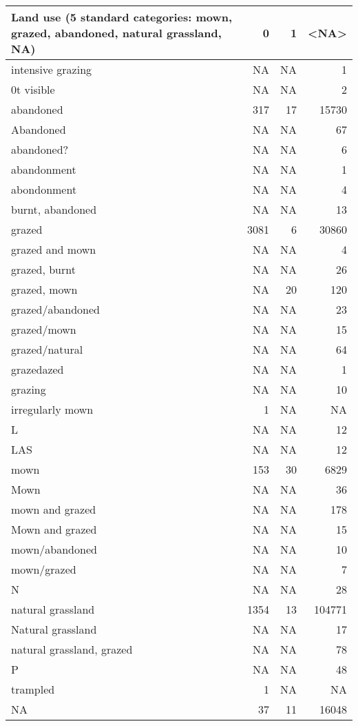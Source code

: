 \documentclass[table]{article}
\begin{document}
\begin{tabular}{>{\raggedright\arraybackslash}p{8cm}|r|r|r}
\hline
Land use (5 standard categories: mown, grazed, abandoned, natural grassland, NA) & 0 & 1 & <NA>\\
\hline
0 intensive grazing & NA & NA & 1\\
\hline
0t visible & NA & NA & 2\\
\hline
abandoned & 317 & 17 & 15730\\
\hline
Abandoned & NA & NA & 67\\
\hline
abandoned? & NA & NA & 6\\
\hline
abandonment & NA & NA & 1\\
\hline
abondonment & NA & NA & 4\\
\hline
burnt, abandoned & NA & NA & 13\\
\hline
grazed & 3081 & 6 & 30860\\
\hline
grazed and mown & NA & NA & 4\\
\hline
grazed, burnt & NA & NA & 26\\
\hline
grazed, mown & NA & 20 & 120\\
\hline
grazed/abandoned & NA & NA & 23\\
\hline
grazed/mown & NA & NA & 15\\
\hline
grazed/natural & NA & NA & 64\\
\hline
grazedazed & NA & NA & 1\\
\hline
grazing & NA & NA & 10\\
\hline
irregularly mown & 1 & NA & NA\\
\hline
L & NA & NA & 12\\
\hline
LAS & NA & NA & 12\\
\hline
mown & 153 & 30 & 6829\\
\hline
Mown & NA & NA & 36\\
\hline
mown and grazed & NA & NA & 178\\
\hline
Mown and grazed & NA & NA & 15\\
\hline
mown/abandoned & NA & NA & 10\\
\hline
mown/grazed & NA & NA & 7\\
\hline
N & NA & NA & 28\\
\hline
natural grassland & 1354 & 13 & 104771\\
\hline
Natural grassland & NA & NA & 17\\
\hline
natural grassland, grazed & NA & NA & 78\\
\hline
P & NA & NA & 48\\
\hline
trampled & 1 & NA & NA\\
\hline
NA & 37 & 11 & 16048\\
\hline
\end{tabular}
\end{document}
